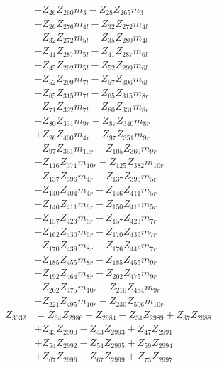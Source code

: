 \begin{multicols}{2}
\begin{align}
&- Z_{26}Z_{260}m_3 - Z_{28}Z_{265}m_3  \nonumber \\
&- Z_{26}Z_{276}m_{4l} - Z_{32}Z_{272}m_{4l}  \nonumber \\
&- Z_{32}Z_{272}m_{5l} - Z_{35}Z_{280}m_{4l}  \nonumber \\
&- Z_{41}Z_{287}m_{5l} - Z_{41}Z_{287}m_{6l}  \nonumber \\
&- Z_{45}Z_{292}m_{5l} - Z_{52}Z_{299}m_{6l}  \nonumber \\
&- Z_{52}Z_{299}m_{7l} - Z_{57}Z_{306}m_{6l}  \nonumber \\
&- Z_{65}Z_{315}m_{7l} - Z_{65}Z_{315}m_{8r}  \nonumber \\
&- Z_{71}Z_{322}m_{7l} - Z_{80}Z_{331}m_{8r}  \nonumber \\
&- Z_{80}Z_{331}m_{9r} - Z_{87}Z_{340}m_{8r}  \nonumber \\
&+ Z_{26}Z_{400}m_{4r} - Z_{97}Z_{351}m_{9r}  \nonumber \\
&- Z_{97}Z_{351}m_{10r} - Z_{105}Z_{360}m_{9r}  \nonumber \\
&- Z_{116}Z_{371}m_{10r} - Z_{125}Z_{382}m_{10r}  \nonumber \\
&- Z_{137}Z_{396}m_{4r} - Z_{137}Z_{396}m_{5r}  \nonumber \\
&- Z_{140}Z_{404}m_{4r} - Z_{146}Z_{411}m_{5r}  \nonumber \\
&- Z_{146}Z_{411}m_{6r} - Z_{150}Z_{416}m_{5r}  \nonumber \\
&- Z_{157}Z_{423}m_{6r} - Z_{157}Z_{423}m_{7r}  \nonumber \\
&- Z_{162}Z_{430}m_{6r} - Z_{170}Z_{439}m_{7r}  \nonumber \\
&- Z_{170}Z_{439}m_{8r} - Z_{176}Z_{446}m_{7r}  \nonumber \\
&- Z_{185}Z_{455}m_{8r} - Z_{185}Z_{455}m_{9r}  \nonumber \\
&- Z_{192}Z_{464}m_{8r} - Z_{202}Z_{475}m_{9r}  \nonumber \\
&- Z_{202}Z_{475}m_{10r} - Z_{210}Z_{484}m_{9r}  \nonumber \\
&- Z_{221}Z_{495}m_{10r} - Z_{230}Z_{506}m_{10r} \nonumber \\
Z_{3032} &= Z_{34}Z_{2986} - Z_{2984} - Z_{34}Z_{2989} + Z_{37}Z_{2988}  \nonumber \\
&+ Z_{43}Z_{2990} - Z_{43}Z_{2993} + Z_{47}Z_{2991}  \nonumber \\
&+ Z_{54}Z_{2992} - Z_{54}Z_{2995} + Z_{59}Z_{2994}  \nonumber \\
&+ Z_{67}Z_{2996} - Z_{67}Z_{2999} + Z_{73}Z_{2997}  \nonumber \\

\end{align}
\end{multicols}
